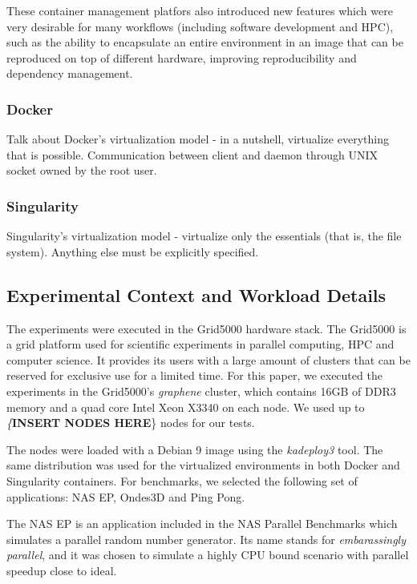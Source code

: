 \documentclass[12pt]{article}
\begin{document}
These container management platfors also introduced new features which were very desirable for many workflows (including software development and HPC), such as the ability to encapsulate an entire environment in an image that can be reproduced on top of different hardware, improving reproducibility and dependency management.

\subsubsection{Docker}
\label{sec:org1c13717}
Talk about Docker's virtualization model - in a nutshell, virtualize everything that is possible. Communication between client and daemon through UNIX socket owned by the root user.

\subsubsection{Singularity}
\label{sec:org5b0c4db}
Singularity's virtualization model - virtualize only the essentials (that is, the file system). Anything else must be explicitly specified.

\subsection{Experimental Context and Workload Details}
\label{sec:org74d783e}
The experiments were executed in the Grid5000 hardware stack. The Grid5000 is a grid platform used for scientific experiments in parallel computing, HPC and computer science. It provides its users with a large amount of clusters that can be reserved for exclusive use for a limited time. For this paper, we executed the experiments in the Grid5000's \textit{graphene} cluster, which contains 16GB of DDR3 memory and a quad core Intel Xeon X3340 on each node. We used up to \textit\{\textbf{INSERT NODES HERE}\} nodes for our tests.

The nodes were loaded with a Debian 9 image using the \textit{kadeploy3} tool. The same distribution was used for the virtualized environments in both Docker and Singularity containers. For benchmarks, we selected the following set of applications: NAS EP, Ondes3D and Ping Pong.

The NAS EP is an application included in the NAS Parallel Benchmarks which simulates a parallel random number generator. Its name stands for \textit{embarassingly parallel}, and it was chosen to simulate a highly CPU bound scenario with parallel speedup close to ideal. 
\end{document}
